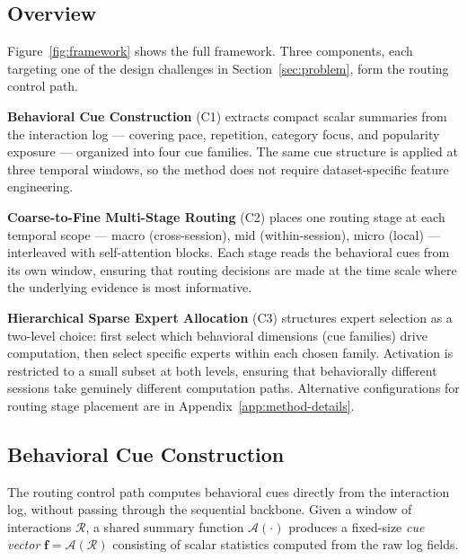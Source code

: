 \documentclass[sigconf,review,anonymous]{acmart}
\begin{document}
\subsection{Overview}
\label{sec:routerec-overview}

Figure~\ref{fig:framework} shows the full framework. Three components, each targeting one of the design challenges in Section~\ref{sec:problem}, form the routing control path.

\textbf{Behavioral Cue Construction} (C1) extracts compact scalar summaries from the interaction log --- covering pace, repetition, category focus, and popularity exposure --- organized into four cue families. The same cue structure is applied at three temporal windows, so the method does not require dataset-specific feature engineering.

\textbf{Coarse-to-Fine Multi-Stage Routing} (C2) places one routing stage at each temporal scope --- macro (cross-session), mid (within-session), micro (local) --- interleaved with self-attention blocks. Each stage reads the behavioral cues from its own window, ensuring that routing decisions are made at the time scale where the underlying evidence is most informative.

\textbf{Hierarchical Sparse Expert Allocation} (C3) structures expert selection as a two-level choice: first select which behavioral dimensions (cue families) drive computation, then select specific experts within each chosen family. Activation is restricted to a small subset at both levels, ensuring that behaviorally different sessions take genuinely different computation paths. Alternative configurations for routing stage placement are in Appendix~\ref{app:method-details}.

\subsection{Behavioral Cue Construction}
\label{sec:feature-construction}

The routing control path computes behavioral cues directly from the interaction log, without passing through the sequential backbone. Given a window of interactions $\mathcal{R}$, a shared summary function $\mathcal{A}(\cdot)$ produces a fixed-size \emph{cue vector} $\mathbf{f} = \mathcal{A}(\mathcal{R})$ consisting of scalar statistics computed from the raw log fields.
\end{document}
